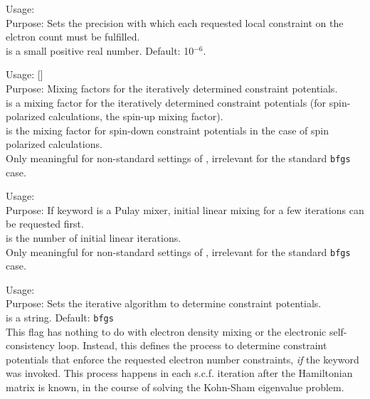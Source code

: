 {
  \noindent
  Usage:   \\[1.0ex]
  Purpose: Sets the precision with which each requested local
    constraint on the elctron count must be fulfilled. \\[1.0ex]
   is a small positive real number. Default:
  10$^{-6}$. \\
}

{
  \noindent
  Usage:   []
    \\[1.0ex]
  Purpose: Mixing factors for the iteratively determined constraint
    potentials. \\[1.0ex] 
   is a mixing factor for the iteratively determined
    constraint potentials (for spin-polarized calculations, the
    spin-up mixing factor). \\
   is the mixing factor for spin-down constraint
    potentials in the case of spin polarized calculations. \\
}
Only meaningful for non-standard settings of
, irrelevant for the standard
\texttt{bfgs} case. 

{
  \noindent
  Usage:  
    \\[1.0ex]
  Purpose: If keyword  is a Pulay mixer,
    initial linear mixing for a few iterations can be requested
    first. \\[1.0ex]
   is the number of initial linear iterations. \\
}
Only meaningful for non-standard settings of
, irrelevant for the standard
\texttt{bfgs} case. 

{
  \noindent
  Usage:   \\[1.0ex]
  Purpose: Sets the iterative algorithm to determine constraint
    potentials. \\[1.0ex]
   is a string. Default: \texttt{bfgs} \\
}
This flag has nothing to do with electron density mixing or the
electronic self-consistency loop. Instead, this defines the process to
determine constraint potentials that enforce the requested electron
number constraints, \emph{if} the keyword  was
invoked. This process happens in each  
s.c.f. iteration after the Hamiltonian matrix is known, in the
course of solving the Kohn-Sham eigenvalue problem.

